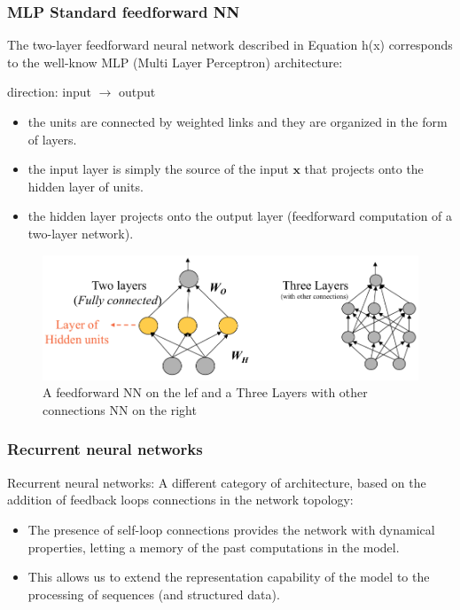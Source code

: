 \documentclass[../main.tex]{subfiles}
\begin{document}
\subsubsection{MLP Standard feedforward NN}
The two-layer feedforward neural network described in Equation h(x) corresponds to the well-know MLP (Multi Layer Perceptron) architecture:
\begin{center}
    direction: input $\rightarrow$ output
\end{center}

\begin{itemize}
    \item the units are connected by weighted links and they are organized in the form of layers.
    
    \item the input layer is simply the source of the input $\mathbf{x}$ that projects onto the hidden layer of units.

    \item the hidden layer projects onto the output layer (feedforward computation of a two-layer network).
\end{itemize}

\begin{figure}[H]
    \centering
    \includegraphics[scale = 0.35]{lectures/4_neural_networks/4_feed_f.png}
    \caption{A feedforward NN on the lef and a Three Layers with other connections NN on the right}
    \label{fig:4_feed_f}
\end{figure}

\subsubsection{Recurrent neural networks}
Recurrent neural networks: A different category of architecture, based
on the addition of feedback loops connections in the network topology:
\begin{itemize}
    \item The presence of self-loop connections provides the network with dynamical properties, letting a memory of the past computations in the model.
    \item This allows us to extend the representation capability of the model to the processing of sequences (and structured data).
\end{itemize}
\end{document}
